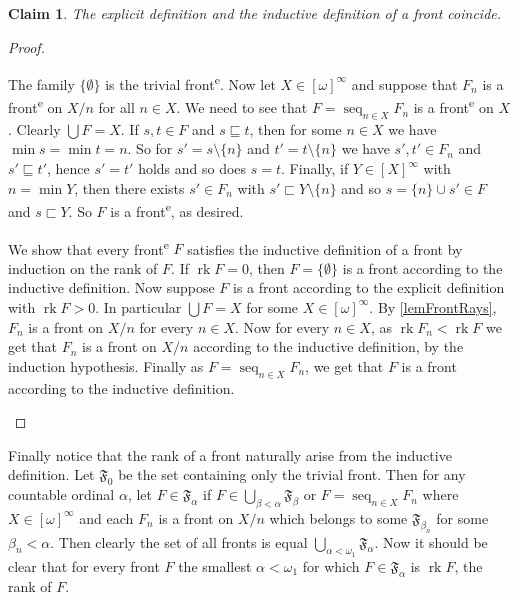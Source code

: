 \documentclass{article}%
\theoremstyle{plain}
\newtheorem{lemma}[theorem]{Properties}
\newtheorem{lemma}[theorem]{Lemma}
\newtheorem{lemma}[theorem]{Fact}
\newtheorem{lemma}[theorem]{Facts}
\newtheorem{lemma}{Claim}
\theoremstyle{definition}
\theoremstyle{remark}
\newcommand{\ts}[1]{\textsuperscript{#1}}
\newcommand{\front}{front\ts{e}}
\DeclareMathOperator*{\Seq}{\mathrm{seq}}
\DeclareMathOperator{\base}{\mathord{\bigcup}}
\DeclareMathOperator{\rk}{rk}
\newcommand{\segm} {\sqsubseteq}
\newcommand{\segs} {\sqsubset}
\newcommand{\infSub}[1]{[#1]^{\infty}}
\begin{document}
\begin{lemma}
The explicit definition and the inductive definition of a front coincide.
\end{lemma}
\begin{proof}
\begin{descProof}
\item[Inductive $\to$ Explicit] The family $\{\emptyset\}$ is the trivial \front{}. Now let $X\in\infSub{\omega}$ and suppose that $F_{n}$ is a \front{} on $X/n$ for all $n\in X$. We need to see that $F=\Seq_{n\in X}F_{n}$ is a \front{} on $X$. Clearly $\base F=X$. If $s,t\in F$ and $s\segm t$, then for some $n\in X$ we have $\min s=\min t=n$. So for $s'=s\setminus \{n\}$ and $t'=t\setminus\{n\}$ we have $s',t'\in F_{n}$ and $s'\segm t'$, hence $s'=t'$ holds and so does $s=t$. Finally, if $Y\in\infSub{X}$ with $n=\min Y$, then there exists $s'\in F_{n}$ with $s'\segs Y\setminus\{n\}$ and so $s=\{n\}\cup s'\in F$ and $s\segs Y$. So $F$ is a \front{}, as desired.

\item[Explicit $\to$ Inductive] We show that every \front{} $F$ satisfies the inductive definition of a front by induction on the rank of $F$. If $\rk F=0$, then $F=\{\emptyset\}$ is a front according to the inductive definition. Now suppose $F$ is a front according to the explicit definition with $\rk F>0$. In particular $\base F=X$ for some $X\in \infSub{\omega}$. 
By \cref{lemFrontRays}, $F_n$ is a front on $X/n$ for every $n\in X$. Now for every $n\in X$, as $\rk F_n<\rk F$ we get that $F_n$ is a front on $X/n$ according to the inductive definition, by the induction hypothesis.
Finally as $F=\Seq_{n\in X} F_{n}$, we get that $F$ is a front according to the inductive definition. \qedhere
\end{descProof}
\end{proof}

Finally notice that the rank of a front naturally arise from the inductive definition. Let $\mathfrak{F}_{0}$ be the set containing only the trivial front. Then for any countable ordinal $\alpha$, let $F\in\mathfrak{F}_{\alpha}$ if $F\in \bigcup_{\beta<\alpha}\mathfrak{F}_{\beta}$ or $F=\Seq_{n\in X} F_{n}$ where $X\in\infSub{\omega}$ and each $F_{n}$ is a front on $X/n$ which belongs to some $\mathfrak{F}_{\beta_{n}}$ for some $\beta_{n}<\alpha$. Then clearly the set of all fronts is equal $\bigcup_{\alpha<\omega_{1}}\mathfrak{F}_{\alpha}$. Now it should be clear that for every front $F$ the smallest $\alpha<\omega_{1}$ for which $F\in \mathfrak{F}_{\alpha}$ is $\rk F$, the rank of $F$. 
\end{document}
